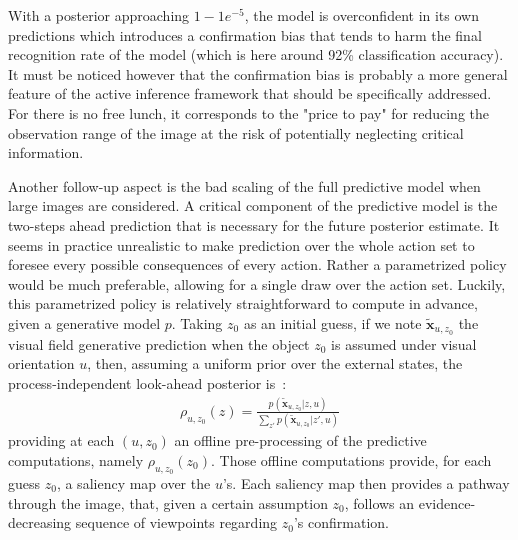 \documentclass{article} %
\begin{document}
With a posterior approaching $1 - 1e^{-5}$, the model is overconfident in its own predictions which introduces a confirmation bias that tends to harm the final recognition rate of the model (which is here around 92\% classification accuracy). It must be noticed however that the confirmation bias is probably a more general feature of the active inference framework that should be specifically addressed. For there is no free lunch, it corresponds to the "price to pay" for reducing the observation range of the image at the risk of potentially neglecting critical information. 

Another follow-up aspect is the bad scaling of the full predictive model when large images are considered. A critical component of the predictive model is the two-steps ahead prediction that is necessary for the future posterior estimate. It seems in practice unrealistic to make prediction over the whole action set to foresee every possible consequences of every action. Rather a parametrized policy would be much preferable, allowing for a single draw over the action set.
Luckily, this parametrized policy is relatively straightforward to compute in advance, given a generative model $p$. Taking $z_0$ as an initial guess, if we note $\tilde{\boldsymbol{x}}_{u,z_0}$ the visual field generative prediction when the object $z_0$ is assumed under visual orientation $u$, then, assuming a uniform prior over the external states, the process-independent look-ahead posterior is~:
\begin{align}
\rho_{u, z_0} (z)=  \frac{p(\tilde{\boldsymbol{x}}_{u, z_0}|z,u)}{\sum_{z'} p(\tilde{\boldsymbol{x}}_{u, z_0}|z',u)}
\end{align}
providing at each $(u, z_0)$ an offline pre-processing of the predictive computations, namely $\rho_{u, z_0}(z_0)$. Those offline computations provide, for each guess $z_0$, a saliency map over the $u$'s. {\color{blue} Each saliency map then provides a pathway through the image, that, given a certain assumption $z_0$, follows an evidence-decreasing sequence of viewpoints regarding $z_0$'s confirmation.}  
\end{document}
